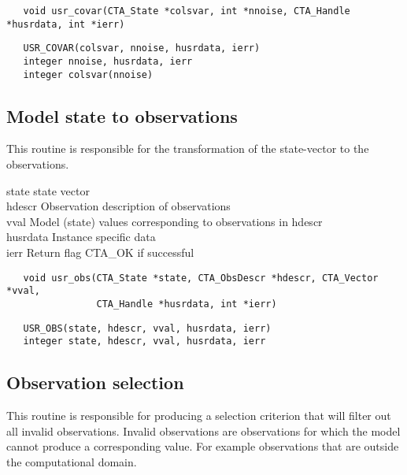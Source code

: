 \begin{verbatim}
   void usr_covar(CTA_State *colsvar, int *nnoise, CTA_Handle *husrdata, int *ierr)
\end{verbatim}

\begin{verbatim}
   USR_COVAR(colsvar, nnoise, husrdata, ierr)
   integer nnoise, husrdata, ierr
   integer colsvar(nnoise)
\end{verbatim}

\subsection{Model state to observations}
This routine is responsible for the transformation of the state-vector to the observations. 

\horzline
\begin{tabbing}
\functab
{}
  {state}        {state vector}\\
  {hdescr}       {Observation description of observations}\\
 {vval}         {Model (state) values corresponding to observations in hdescr}\\
 {husrdata}  {Instance specific data}\\
    {ierr}      {Return flag CTA\_OK if successful}\\
\end{tabbing}
\horzline

\begin{verbatim}
   void usr_obs(CTA_State *state, CTA_ObsDescr *hdescr, CTA_Vector *vval,
                CTA_Handle *husrdata, int *ierr)
\end{verbatim}

\begin{verbatim}
   USR_OBS(state, hdescr, vval, husrdata, ierr)
   integer state, hdescr, vval, husrdata, ierr
\end{verbatim}

\subsection{Observation selection}
This routine is responsible for producing a selection criterion that will filter out all invalid observations.
Invalid observations are observations for which the model cannot produce a corresponding value. For example
observations that are outside the computational domain.

